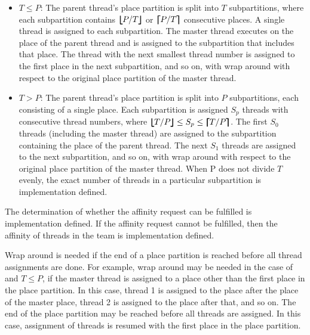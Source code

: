 \begin{itemize}
\item $T \leq P$: The parent thread's place partition is split into $T$ subpartitions, 
                  where each subpartition contains $\bm{\lfloor\mkern-10mu\lfloor} P/T \bm{\rfloor\mkern-10mu\rfloor}$ or 
                  $\bm{\lceil\mkern-10mu\lceil} P/T \bm{\rceil\mkern-10mu\rceil}$ consecutive places. A single thread is 
                  assigned to each subpartition. The master thread executes on 
                  the place of the parent thread and is assigned to the subpartition 
                  that includes that place. The thread with the next smallest thread 
                  number is assigned to the first place in the next subpartition, 
                  and so on, with wrap around with respect to the original place 
                  partition of the master thread.
\item $T > P$: The parent thread's place partition is split into $P$ subpartitions, 
               each consisting of a single place. Each subpartition is assigned 
               $S_{p}$ threads with consecutive thread numbers, where 
               $\blfloor T/P \brfloor \leq S_{p} \leq \blceil T/P \brceil$. The 
               first $S_{0}$ threads (including the master thread) are assigned 
               to the subpartition containing the place of the parent thread. The 
               next $S_{1}$ threads are assigned to the next subpartition, and so 
               on, with wrap around with respect to the original place partition 
               of the master thread. When P does not divide $T$ evenly, the exact 
               number of threads in a particular subpartition is implementation 
               defined.
\end{itemize}

The determination of whether the affinity request can be fulfilled is implementation 
defined. If the affinity request cannot be fulfilled, then the affinity of threads 
in the team is implementation defined.

\begin{note}
Wrap around is needed if the end of a place partition is reached before all thread 
assignments are done. For example, wrap around may be needed in the case of 
 and $T \leq P$, if the master thread is assigned to a place other than 
the first place in the place partition. In this case, thread 1 is assigned to the 
place after the place of the master place, thread 2 is assigned to the place after 
that, and so on. The end of the place partition may be reached before all threads 
are assigned. In this case, assignment of threads is resumed with the first place 
in the place partition.
\end{note}

